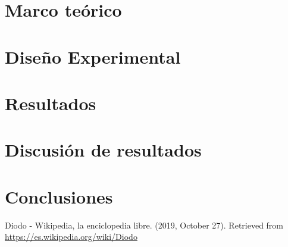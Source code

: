 \documentclass[conference]{IEEEtran}
\begin{document}
\section{Marco teórico}



\section{Diseño Experimental}



\section{Resultados}



\section{Discusión de resultados}



\section{Conclusiones}



\begin{thebibliography}{00}
 Diodo - Wikipedia, la enciclopedia libre. (2019, October 27). Retrieved from \url{https://es.wikipedia.org/wiki/Diodo}
\end{thebibliography}
\end{document}
